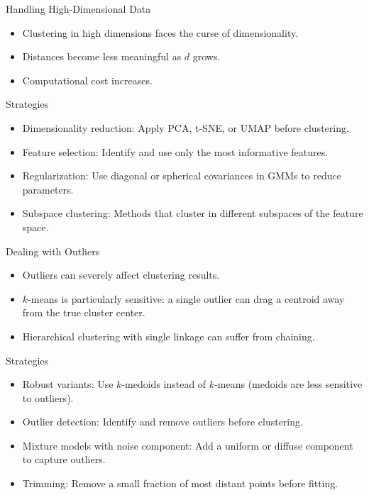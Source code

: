 \begin{frame}{Handling High-Dimensional Data}
  \begin{itemize}
    \item Clustering in high dimensions faces the \alert{curse of dimensionality}.
    \item Distances become less meaningful as $d$ grows.
    \item Computational cost increases.
  \end{itemize}
  \begin{block}{Strategies}
    \begin{itemize}
      \item \alert{Dimensionality reduction}: Apply PCA, t-SNE, or UMAP before clustering.
      \item \alert{Feature selection}: Identify and use only the most informative features.
      \item \alert{Regularization}: Use diagonal or spherical covariances in GMMs to reduce
            parameters.
      \item \alert{Subspace clustering}: Methods that cluster in different subspaces of
            the feature space.
    \end{itemize}
  \end{block}
\end{frame}

\begin{frame}{Dealing with Outliers}
  \begin{itemize}
    \item Outliers can severely affect clustering results.
    \item $k$-means is particularly sensitive: a single outlier can drag a centroid away
          from the true cluster center.
    \item Hierarchical clustering with single linkage can suffer from chaining.
  \end{itemize}
  \begin{block}{Strategies}
    \begin{itemize}
      \item \alert{Robust variants}: Use $k$-medoids instead of $k$-means (medoids are
            less sensitive to outliers).
      \item \alert{Outlier detection}: Identify and remove outliers before clustering.
      \item \alert{Mixture models with noise component}: Add a uniform or diffuse component
            to capture outliers.
      \item \alert{Trimming}: Remove a small fraction of most distant points before fitting.
    \end{itemize}
  \end{block}
\end{frame}

